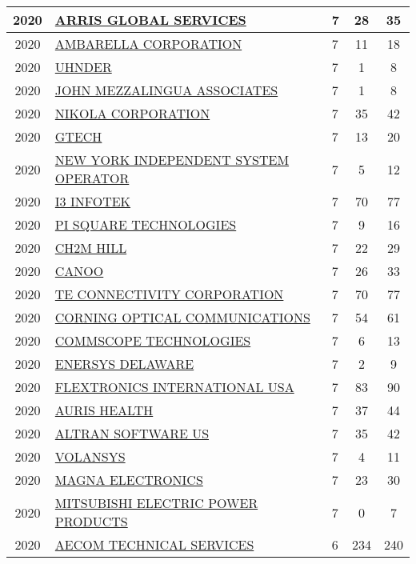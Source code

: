 \documentclass{article}%
\begin{document}
\begin{longtable}{c|p{20em}|p{5em}|c|c}
\hline%
2020&\hyperref[subsec:ARRISGLOBALSERVICES]{ARRIS GLOBAL SERVICES}&7&28&35\\%
\hline%
2020&\hyperref[subsec:AMBARELLACORPORATION]{AMBARELLA CORPORATION}&7&11&18\\%
\hline%
2020&\hyperref[subsec:UHNDER]{UHNDER}&7&1&8\\%
\hline%
2020&\hyperref[subsec:JOHNMEZZALINGUAASSOCIATES]{JOHN MEZZALINGUA ASSOCIATES}&7&1&8\\%
\hline%
2020&\hyperref[subsec:NIKOLACORPORATION]{NIKOLA CORPORATION}&7&35&42\\%
\hline%
2020&\hyperref[subsec:GTECH]{GTECH}&7&13&20\\%
\hline%
2020&\hyperref[subsec:NEWYORKINDEPENDENTSYSTEMOPERATOR]{NEW YORK INDEPENDENT SYSTEM OPERATOR}&7&5&12\\%
\hline%
2020&\hyperref[subsec:I3INFOTEK]{I3 INFOTEK}&7&70&77\\%
\hline%
2020&\hyperref[subsec:PISQUARETECHNOLOGIES]{PI SQUARE TECHNOLOGIES}&7&9&16\\%
\hline%
2020&\hyperref[subsec:CH2MHILL]{CH2M HILL}&7&22&29\\%
\hline%
2020&\hyperref[subsec:CANOO]{CANOO}&7&26&33\\%
\hline%
2020&\hyperref[subsec:TECONNECTIVITYCORPORATION]{TE CONNECTIVITY CORPORATION}&7&70&77\\%
\hline%
2020&\hyperref[subsec:CORNINGOPTICALCOMMUNICATIONS]{CORNING OPTICAL COMMUNICATIONS}&7&54&61\\%
\hline%
2020&\hyperref[subsec:COMMSCOPETECHNOLOGIES]{COMMSCOPE TECHNOLOGIES}&7&6&13\\%
\hline%
2020&\hyperref[subsec:ENERSYSDELAWARE]{ENERSYS DELAWARE}&7&2&9\\%
\hline%
2020&\hyperref[subsec:FLEXTRONICSINTERNATIONALUSA]{FLEXTRONICS INTERNATIONAL USA}&7&83&90\\%
\hline%
2020&\hyperref[subsec:AURISHEALTH]{AURIS HEALTH}&7&37&44\\%
\hline%
2020&\hyperref[subsec:ALTRANSOFTWAREUS]{ALTRAN SOFTWARE US}&7&35&42\\%
\hline%
2020&\hyperref[subsec:VOLANSYS]{VOLANSYS}&7&4&11\\%
\hline%
2020&\hyperref[subsec:MAGNAELECTRONICS]{MAGNA ELECTRONICS}&7&23&30\\%
\hline%
2020&\hyperref[subsec:MITSUBISHIELECTRICPOWERPRODUCTS]{MITSUBISHI ELECTRIC POWER PRODUCTS}&7&0&7\\%
\hline%
2020&\hyperref[subsec:AECOMTECHNICALSERVICES]{AECOM TECHNICAL SERVICES}&6&234&240\\%

\end{longtable}
\end{document}
